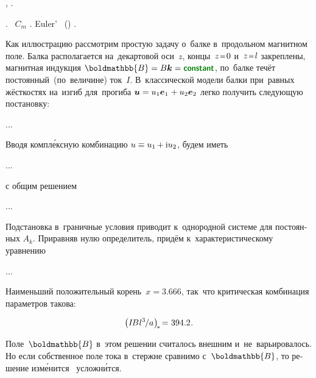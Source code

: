 \begin{otherlanguage}{russian}
%
\en{,}
,
.
%

.
~$C_m$
\ru{,}
.
 Euler’~%
()
.

Как иллюстрацию рассмотрим простую задачу о~балке в~продольном магнитном поле.
Балка располагается на~декартовой оси~$z$, концы~${z \narroweq 0}$ и~${z \narroweq l}$ закреплены, магнитная индукция ${\boldmathbb{B} = B\bm{k} = \boldconstant}$, по~балке течёт постоянный~(по~величине) ток~$I$.
В~классической модели балки при~равных жёсткостях на~изгиб для~прогиба ${\bm{u} = u_1 \bm{e}_1 \hspace{.16ex} + u_2 \bm{e}_2}$ легко получить следующую постановку:

...

Вводя компл\'{е}ксную комбинацию
${u \equiv u_1 \hspace{-0.16ex} + \mathrm{i} u_2}$,
будем иметь

...

\noindent
с общим решением

...

\noindent
Подстановка в~граничные условия приводит к~однородной системе для постоянных ${A_k}$.
Приравняв нулю определитель, придём к~характеристическому уравнению

...

\noindent
Наименьший положительный корень~${x = 3.666}$,
так~что критическая комбинация параметров такова:

\noindent\begin{equation*}
\left(
I \hspace{-0.25ex} B \hspace{.1ex} {l^3} \hspace{-0.2ex} / a \hspace{.1ex}
\right)_{\hspace{-0.32ex}*}
\hspace{-0.32ex} = \hspace{.1ex}
394.2
\hspace{.1ex} .
\end{equation*}

Поле~$\boldmathbb{B}$
в~этом решении
считалось внешним
и~не~варьировалось.
Но
если
собственное поле тока
в~стержне
сравнимо
с~$\boldmathbb{B}$,
то решение
изм\'{е}нится
~усложн\'{и}тся.

\end{otherlanguage}


